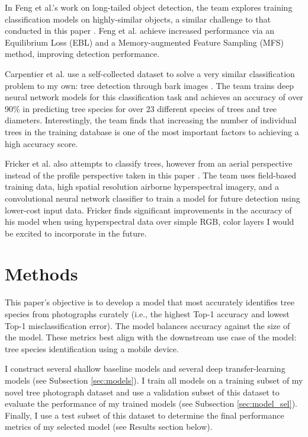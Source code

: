 \documentclass[10pt,twocolumn,letterpaper]{article}
\begin{document}
In Feng et al.'s work on long-tailed object detection, the team explores training classification models on highly-similar objects, a similar challenge to that conducted in this paper \cite{Feng_2021_ICCV}. Feng et al. achieve increased performance via an Equilibrium Loss (EBL) and a Memory-augmented Feature Sampling (MFS) method, improving detection performance.

Carpentier et al. use a self-collected dataset to solve a very similar classification problem to my own: tree detection through bark images \cite{Carpentier_2018}. The team trains deep neural network models for this classification task and achieves an accuracy of over 90\% in predicting tree species for over 23 different species of trees and tree diameters. Interestingly, the team finds that increasing the number of individual trees in the training database is one of the most important factors to achieving a high accuracy score.

Fricker et al. also attempts to classify trees, however from an aerial perspective instead of the profile perspective taken in this paper \cite{Fricker_RS_2019}. The team uses field-based training data, high spatial resolution airborne hyperspectral imagery, and a convolutional neural network classifier to train a model for future detection using lower-cost input data. Fricker finds significant improvements in the accuracy of his model when using hyperspectral data over simple RGB, color layers I would be excited to incorporate in the future.

\section{Methods}
\label{sec:methods}
This paper's objective is to develop a model that most accurately identifies tree species from photographs curately (i.e., the highest Top-1 accuracy and lowest Top-1 misclassification error). The model balances accuracy against the size of the model. These metrics best align with the downstream use case of the model: tree species identification using a mobile device. 

I construct several shallow baseline models and several deep transfer-learning models (see Subsection \ref{sec:models}). I train all models on a training subset of my novel tree photograph dataset and use a validation subset of this dataset to evaluate the performance of my trained models (see Subsection \ref{sec:model_sel}). Finally, I use a test subset of this dataset to determine the final performance metrics of my selected model (see Results section below).  
\end{document}
